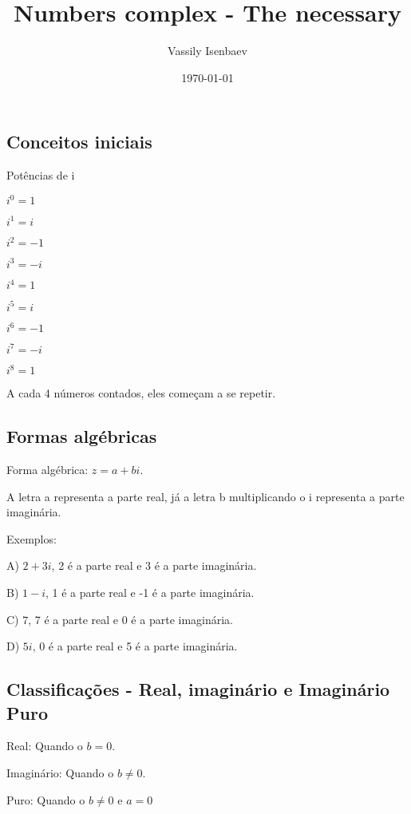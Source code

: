 \documentclass[]{article}
\title{Numbers complex - The necessary}
\author{Vassily Isenbaev}
\date{\today}
\begin{document}
\maketitle
\begin{large}
\section{Conceitos iniciais}
\begin{flushleft}

Potências de i \vspace{.3cm}

$i^0 = 1$

$i^1 = i$

$i^2 = -1$

$i^3 = -i$

$i^4 = 1$

$i^5 = i$

$i^6 = -1$

$i^7 = -i$

$i^8 = 1$ \vspace{.3cm}

A cada 4 números contados, eles começam a se repetir.

\subsection{Formas algébricas}

Forma algébrica: $z=a+bi$.

A letra a representa a parte real, já a letra b multiplicando o i representa a parte imaginária.

Exemplos: \vspace{.3cm}

A) $2+3i$, 2 é a parte real e 3 é a parte imaginária.

B) $1-i$, 1 é a parte real e -1 é a parte imaginária.

C) $7$, 7 é a parte real e 0 é a parte imaginária.

D) $5i$, 0 é a parte real e 5 é a parte imaginária.

\subsection{Classificações - Real, imaginário e Imaginário Puro}

Real: Quando o $b = 0$.

Imaginário: Quando o $b \not= 0$.

Puro: Quando o $b \not= 0$ e $a = 0$


\end{flushleft}
\end{large}
\end{document}
